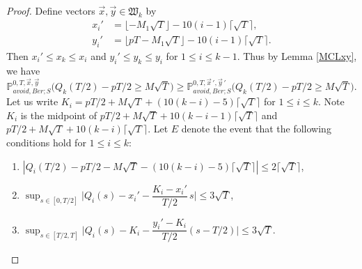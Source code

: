 \begin{proof}
	Define vectors $\vec{x},\vec{y}\in\mathfrak{W}_k$ by
	\begin{align*}
	x_i' &= \lfloor - M_1\sqrt{T} \rfloor - 10(i-1)\lceil\sqrt{T}\rceil,\\
	y_i' &= \lfloor pT - M_1\sqrt{T}\rfloor - 10(i-1)\lceil\sqrt{T}\rceil.
	\end{align*}
	Then $x_i'\leq x_k \leq x_i$ and $y_i' \leq y_k \leq y_i$ for $1\leq i\leq k-1$. Thus by Lemma \ref{MCLxy}, we have
	\begin{equation*}
	\mathbb{P}^{0,T,\vec{x},\vec{y}}_{avoid, Ber; S} \Big(Q_k(T/2) - pT/2 \geq M\sqrt{T}\Big) \geq \mathbb{P}^{0,T,\vec{x}\,',\vec{y}\,'}_{avoid, Ber; S} \Big(Q_k(T/2) - pT/2 \geq M\sqrt{T}\Big).
	\end{equation*}
	Let us write $K_i = pT/2 + M\sqrt{T}+(10(k-i)-5)\lceil\sqrt{T}\rceil$ for $1\leq i\leq k$. Note $K_i$ is the midpoint of $pT/2 + M\sqrt{T} + 10(k-i-1)\lceil\sqrt{T}\rceil$ and $pT/2 + M\sqrt{T}+10(k-i)\lceil\sqrt{T}\rceil$. Let $E$ denote the event that the following conditions hold for $1\leq i\leq k$:
	\begin{enumerate}[label=(\arabic*)]
		
		\item $\left| Q_i(T/2) - pT/2 - M\sqrt{T} - (10(k-i)-5)\lceil\sqrt{T}\rceil \right| \leq 2\lceil\sqrt{T}\rceil$,
		
		\item $\sup_{s\in[0,T/2]} \Big|Q_i(s)-x_i'-\dfrac{K_i-x_i'}{T/2}\,s\Big| \leq 3\sqrt{T}$,
		
		\item $\sup_{s\in[T/2,T]} \Big|Q_i(s)-K_i-\dfrac{y_i'-K_i}{T/2}(s-T/2)\Big| \leq 3\sqrt{T}$.
		

\end{enumerate}
\end{proof}
